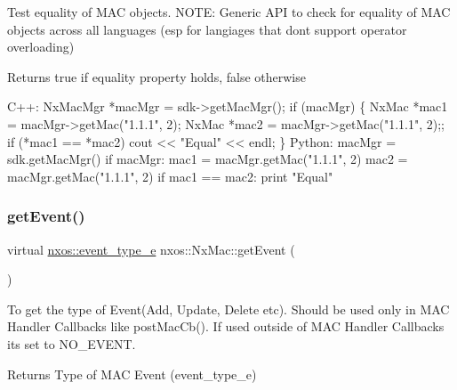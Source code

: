 Test equality of M\+AC objects. N\+O\+TE\+: Generic A\+PI to check for equality of M\+AC objects across all languages (esp for langiages that dont support operator overloading)

\begin{DoxyReturn}{Returns}
true if equality property holds, false otherwise
\end{DoxyReturn}

\begin{DoxyCode}
C++:
    NxMacMgr *macMgr = sdk->getMacMgr();
    \textcolor{keywordflow}{if} (macMgr) \{
        NxMac *mac1 = macMgr->getMac(\textcolor{stringliteral}{"1.1.1"}, 2);
        NxMac *mac2 = macMgr->getMac(\textcolor{stringliteral}{"1.1.1"}, 2);;
        \textcolor{keywordflow}{if} (*mac1 == *mac2)
            cout << \textcolor{stringliteral}{"Equal"} << endl;
    \}
Python:
    macMgr = sdk.getMacMgr()
    \textcolor{keywordflow}{if} macMgr:
       mac1 = macMgr.getMac(\textcolor{stringliteral}{"1.1.1"}, 2)
       mac2 = macMgr.getMac(\textcolor{stringliteral}{"1.1.1"}, 2)
       \textcolor{keywordflow}{if} mac1 == mac2:
          print \textcolor{stringliteral}{"Equal"}
\end{DoxyCode}
 \mbox{\label{classnxos_1_1_nx_mac_a78876af7dfe79a990ea9eacc6f6dd078}} 
\subsubsection{\texorpdfstring{get\+Event()}{getEvent()}}
{\footnotesize\ttfamily virtual \mbox{\hyperlink{nx__common_8h_af9a9040b7681199d386e94eb888018cb}{nxos\+::event\+\_\+type\+\_\+e}} nxos\+::\+Nx\+Mac\+::get\+Event (\begin{DoxyParamCaption}{ }\end{DoxyParamCaption})\hspace{0.3cm}{\ttfamily [pure virtual]}}

To get the type of Event(\+Add, Update, Delete etc). Should be used only in M\+AC Handler Callbacks like post\+Mac\+Cb(). If used outside of M\+AC Handler Callbacks its set to N\+O\+\_\+\+E\+V\+E\+NT.

\begin{DoxyReturn}{Returns}
Type of M\+AC Event (event\+\_\+type\+\_\+e)
\end{DoxyReturn}

